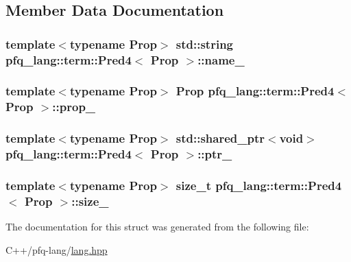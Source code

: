 \subsection{Member Data Documentation}
\hypertarget{structpfq__lang_1_1term_1_1Pred4_a57f3123042c7ab4bba88d975449624b5}{
\subsubsection[{name\-\_\-}]{\setlength{\rightskip}{0pt plus 5cm}template$<$typename Prop$>$ std\-::string {\bf pfq\-\_\-lang\-::term\-::\-Pred4}$<$ {\bf Prop} $>$\-::name\-\_\-}}\label{structpfq__lang_1_1term_1_1Pred4_a57f3123042c7ab4bba88d975449624b5}
\hypertarget{structpfq__lang_1_1term_1_1Pred4_ab5f3d36392d98a2549b8e517f8919163}{
\subsubsection[{prop\-\_\-}]{\setlength{\rightskip}{0pt plus 5cm}template$<$typename Prop$>$ {\bf Prop} {\bf pfq\-\_\-lang\-::term\-::\-Pred4}$<$ {\bf Prop} $>$\-::prop\-\_\-}}\label{structpfq__lang_1_1term_1_1Pred4_ab5f3d36392d98a2549b8e517f8919163}
\hypertarget{structpfq__lang_1_1term_1_1Pred4_abb2d1d1471c132aa44cb302ff97cb5d3}{
\subsubsection[{ptr\-\_\-}]{\setlength{\rightskip}{0pt plus 5cm}template$<$typename Prop$>$ std\-::shared\-\_\-ptr$<$void$>$ {\bf pfq\-\_\-lang\-::term\-::\-Pred4}$<$ {\bf Prop} $>$\-::ptr\-\_\-}}\label{structpfq__lang_1_1term_1_1Pred4_abb2d1d1471c132aa44cb302ff97cb5d3}
\hypertarget{structpfq__lang_1_1term_1_1Pred4_a8b048607b50bc442cf98b31987df7a53}{
\subsubsection[{size\-\_\-}]{\setlength{\rightskip}{0pt plus 5cm}template$<$typename Prop$>$ size\-\_\-t {\bf pfq\-\_\-lang\-::term\-::\-Pred4}$<$ {\bf Prop} $>$\-::size\-\_\-}}\label{structpfq__lang_1_1term_1_1Pred4_a8b048607b50bc442cf98b31987df7a53}


The documentation for this struct was generated from the following file\-:\begin{DoxyCompactItemize}
\item 
C++/pfq-\/lang/\hyperlink{lang_8hpp}{lang.\-hpp}\end{DoxyCompactItemize}
